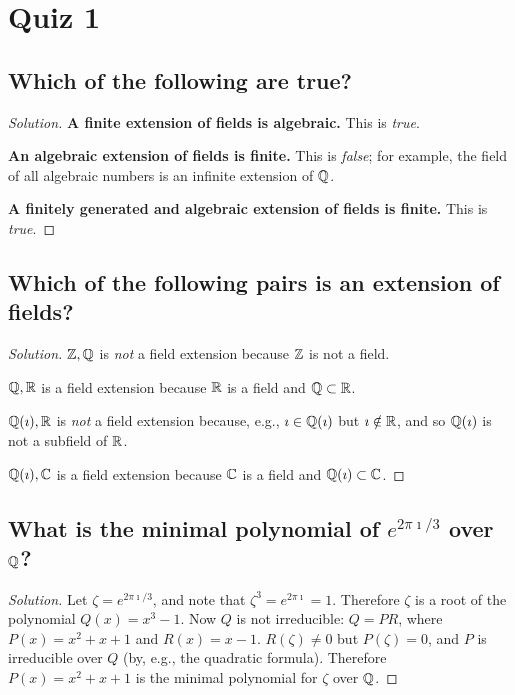 \section*{Quiz 1}

\subsection*{Which of the following are true?}
\begin{proof}[Solution]
\textbf{A finite extension of fields is algebraic.} This is \emph{true}.

\textbf{An algebraic extension of fields is finite.} This is \emph{false}; for example, the field of all algebraic numbers is an infinite extension of $\mathbb{Q}$.

\textbf{A finitely generated and algebraic extension of fields is finite.} This is \emph{true}.
\end{proof}

\subsection*{Which of the following pairs is an extension of fields?}
\begin{proof}[Solution]
$\mathbb{Z}, \mathbb{Q}$ is \emph{not} a field extension because $\mathbb{Z}$ is not a field.

$\mathbb{Q}, \mathbb{R}$ is a field extension because $\mathbb{R}$ is a field and $\mathbb{Q} \subset \mathbb{R}$.

$\mathbb{Q}(\imath), \mathbb{R}$ is \emph{not} a field extension because, e.g., $\imath \in \mathbb{Q}(\imath)$ but $\imath \notin \mathbb{R}$, and so $\mathbb{Q}(\imath)$ is not a subfield of $\mathbb{R}$.

$\mathbb{Q}(\imath), \mathbb{C}$ is a field extension because $\mathbb{C}$ is a field and $\mathbb{Q}(\imath) \subset \mathbb{C}$.
\end{proof}

\subsection*{What is the minimal polynomial of $e^{2\pi\imath/3}$ over $\mathbb{Q}$?}
\begin{proof}[Solution]
Let $\zeta = e^{2\pi\imath/3}$, and note that $\zeta^3 = e^{2\pi\imath} = 1$. Therefore $\zeta$ is a root of the polynomial $Q(x) = x^3 - 1$. Now $Q$ is not irreducible: $Q = PR$, where $P(x) = x^2 + x + 1$ and $R(x) = x - 1$. $R(\zeta) \neq 0$ but $P(\zeta) = 0$, and $P$ is irreducible over $Q$ (by, e.g., the quadratic formula). Therefore $P(x) = x^2 + x + 1$ is the minimal polynomial for $\zeta$ over $\mathbb{Q}$.
\end{proof}

